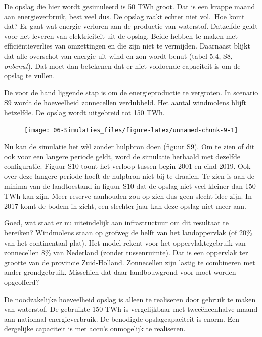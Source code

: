 \documentclass[
  11pt,
  a4paper,
]{book}
\begin{document}
De opslag die hier wordt gesimuleerd is 50 TWh groot. Dat is een krappe maand aan energieverbruik, best veel dus. De opslag raakt echter niet vol.~Hoe komt dat? Er gaat wat energie verloren aan de productie van waterstof. Datzelfde geldt voor het leveren van elektriciteit uit de opslag. Beide hebben te maken met efficiëntieverlies van omzettingen en die zijn niet te vermijden. Daarnaast blijkt dat alle overschot van energie uit wind en zon wordt benut (tabel 5.4, S8, \emph{onbenut}). Dat moet dan betekenen dat er niet voldoende capaciteit is om de opslag te vullen.

De voor de hand liggende stap is om de energieproductie te vergroten. In scenario S9 wordt de hoeveelheid zonnecellen verdubbeld. Het aantal windmolens blijft hetzelfde. De opslag wordt uitgebreid tot 150 TWh.

\begin{figure}

{\centering \texttt{[image: 06-Simulaties\_files/figure-latex/unnamed-chunk-9-1]} 

}

\end{figure}

Nu kan de simulatie het wèl zonder hulpbron doen (figuur S9). Om te zien of dit ook voor een langere periode geldt, word de simulatie herhaald met dezelfde configuratie. Figuur S10 toont het verloop tussen begin 2001 en eind 2019. Ook over deze langere periode hoeft de hulpbron niet bij te draaien. Te zien is aan de minima van de laadtoestand in figuur S10 dat de opslag niet veel kleiner dan 150 TWh kan zijn. Meer reserve aanhouden zou op zich dus geen slecht idee zijn. In 2017 komt de bodem in zicht, een slechter jaar kan deze opslag niet meer aan.

Goed, wat staat er nu uiteindelijk aan infrastructuur om dit resultaat te bereiken? Windmolens staan op grofweg de helft van het landoppervlak (of 20\% van het continentaal plat). Het model rekent voor het oppervlaktegebruik van zonnecellen 8\% van Nederland (zonder tussenruimte). Dat is een oppervlak ter grootte van de provincie Zuid-Holland. Zonnecellen zijn lastig te combineren met ander grondgebruik. Misschien dat daar landbouwgrond voor moet worden opgeofferd?

De noodzakelijke hoeveelheid opslag is alleen te realiseren door gebruik te maken van waterstof. De gebruikte 150 TWh is vergelijkbaar met tweeëneenhalve maand aan nationaal energieverbruik. De benodigde opslagcapaciteit is enorm. Een dergelijke capaciteit is met accu's onmogelijk te realiseren.
\end{document}
